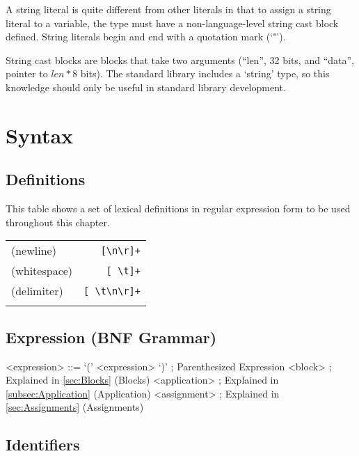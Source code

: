 \documentclass[letterpaper,titlepage]{scrreprt}
\begin{document}
A string literal is quite different from other literals in that to assign a string literal to a variable, the type must have a non-language-level string cast block defined. String literals begin and end with a quotation mark (`"').

String cast blocks are blocks that take two arguments (``len'', 32 bits, and ``data'', pointer to $len * 8$ bits). The standard library includes a `string' type, so this knowledge should only be useful in standard library development.

\chapter{Syntax}
\label{ch:Syntax}

\section{Definitions}
\label{sec:Definitions}

This table shows a set of lexical definitions in regular expression form to be used throughout this chapter.

\begin{tabular}{l r}

(newline) & \lstinline|[\n\r]+| \\
\label{def:newline}
(whitespace) & \lstinline|[ \t]+| \\
\label{def:whitespace}
(delimiter) & \lstinline|[ \t\n\r]+| \\
\label{def:delimiter}

\end{tabular}

\section{Expression (BNF Grammar)}
\label{sec:Expression}

\begin{grammar}

<expression> ::= `(' <expression> `)' ; Parenthesized Expression
\alt <block> ; Explained in \hyperref[sec:Blocks]{\ref{sec:Blocks}} (Blocks)
\alt <application> ; Explained in \hyperref[subsec:Application]{\ref{subsec:Application}} (Application)
\alt <assignment> ; Explained in \hyperref[sec:Assignments]{\ref{sec:Assignments}} (Assignments)

\end{grammar}

\section{Identifiers}
\label{sec:Identifiers}
\end{document}
